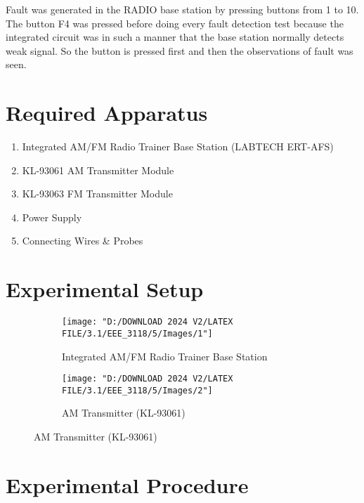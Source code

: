 \documentclass[a4paper,12pt]{article}
\begin{document}
	Fault was generated in the RADIO base station by pressing buttons from 1 to 10. The button F4 was pressed before doing every fault detection test because the integrated circuit was in such a manner that the base station normally detects weak signal. So the button is pressed first and then the observations of fault was seen.
	
	
	
	
	
	\section{Required Apparatus}
	
	\begin{enumerate}
		\item Integrated AM/FM Radio Trainer Base Station (LABTECH ERT-AFS)
		\item KL-93061 AM Transmitter Module
		\item KL-93063 FM Transmitter Module
		\item Power Supply
		\item Connecting Wires \& Probes
	\end{enumerate}
	
	
	\section{Experimental Setup}
	\begin{figure}[H]
		\centering
		\begin{subfigure}[t]{0.9\textwidth}
			\centering
			\texttt{[image: "D:/DOWNLOAD 2024 V2/LATEX FILE/3.1/EEE\_3118/5/Images/1"]}
			\caption{Integrated AM/FM Radio Trainer Base Station}
			\vspace{0.1cm}
		\end{subfigure}
		
		\begin{subfigure}[t]{0.9\textwidth}
			\centering
			\texttt{[image: "D:/DOWNLOAD 2024 V2/LATEX FILE/3.1/EEE\_3118/5/Images/2"]}
			\caption{AM Transmitter (KL-93061)}
		\end{subfigure}
	\end{figure}
	\section{ Experimental Procedure}
	
\end{document}
